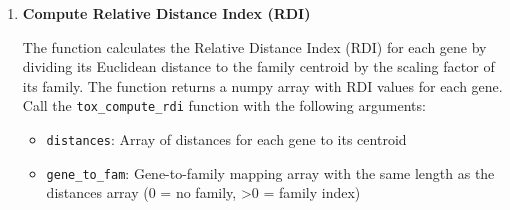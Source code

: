 \begin{enumerate}
\begin{enumerate}
\begin{itemize}
                    \item \textbf{loess\_y}: Array of y coordinates used as reference points
                          for LOESS smoothing (standard deviation)
                          
                    \item \textbf{indices\_used}: Array of indices of families that have
                          been included in the calculation
                          
                    \item \textbf{perm\_tmp}: Permutation array for sorting
                          
                    \item \textbf{stack\_left\_tmp}: Stack array for sorting
                          
                    \item \textbf{stack\_right\_tmp}: Stack array for sorting
                          
                    \item \textbf{family\_distances}: Work array for sorting
                  \end{itemize}
                  \begin{lstlisting}[language=Python, caption={Python Compute Family Scaling (Expert Version)}]
tox_compute_family_scaling_expert(distances, gene_to_fam, perm_tmp, 
                stack_left_tmp, stack_right_tmp, family_distances)
                  \end{lstlisting}
                  
            \item \textbf{Compute Relative Distance Index (RDI)}
                  
                  The function calculates the Relative Distance Index (RDI) for each gene
                  by dividing its Euclidean distance to the family centroid by the scaling
                  factor of its family. The function returns a numpy array with RDI
                  values for each gene. Call the \texttt{tox\_compute\_rdi} function
                  with the following arguments:
                  
                  \begin{itemize}
                    \item \texttt{distances}: Array of distances for each gene to its centroid
                          
                    \item \texttt{gene\_to\_fam}: Gene-to-family mapping array with the same
                          length as the distances array (0 = no family, \textgreater 0 = family
                          index)
                          

\end{itemize}
\end{enumerate}
\end{enumerate}
